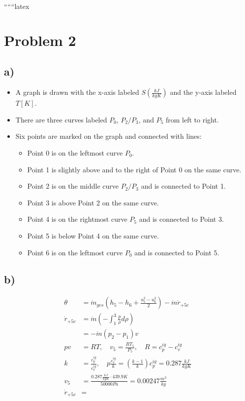 
``````latex


\section*{Problem 2}

\subsection*{a)}

\begin{itemize}
    \item A graph is drawn with the x-axis labeled \( S \left( \frac{kJ}{kgK} \right) \) and the y-axis labeled \( T \left[ K \right] \).
    \item There are three curves labeled \( P_0 \), \( P_2/P_3 \), and \( P_5 \) from left to right.
    \item Six points are marked on the graph and connected with lines:
    \begin{itemize}
        \item Point 0 is on the leftmost curve \( P_0 \).
        \item Point 1 is slightly above and to the right of Point 0 on the same curve.
        \item Point 2 is on the middle curve \( P_2/P_3 \) and is connected to Point 1.
        \item Point 3 is above Point 2 on the same curve.
        \item Point 4 is on the rightmost curve \( P_5 \) and is connected to Point 3.
        \item Point 5 is below Point 4 on the same curve.
        \item Point 6 is on the leftmost curve \( P_0 \) and is connected to Point 5.
    \end{itemize}
\end{itemize}

\subsection*{b)}

\begin{align*}
\theta &= \dot{m}_{ges} \left( h_5 - h_6 + \frac{u_5^2 - u_6^2}{2} \right) - \dot{m} \dot{r}_{+5c} \\
\dot{r}_{+5c} &= \dot{m} \left( - \int_{1}^{3} \frac{p}{\rho} d\rho \right) \\
&= - \dot{m} \left( p_2 - p_1 \right) v \\
pv &= RT, \quad v_5 = \frac{R T_5}{P_5}, \quad R = c_p^{ig} - c_v^{ig} \\
k &= \frac{c_p^{ig}}{c_v^{ig}}, \quad p \frac{c_v^{ig}}{k} = \left( \frac{k - 1}{k} \right) c_p^{ig} = 0.287 \frac{kJ}{kgK} \\
v_5 &= \frac{0.287 \frac{kJ}{kgK} \cdot 439.9 K}{50000 Pa} = 0.00247 \frac{m^3}{kg} \\
\dot{r}_{+5c} &= 
\end{align*}

